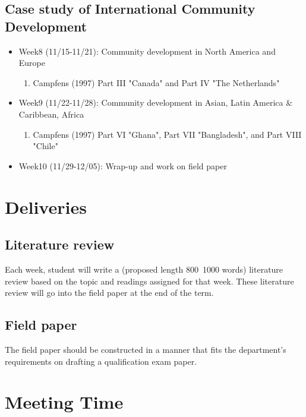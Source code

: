 \documentclass{article}
\begin{document}
\subsection{Case study of International Community Development}

\begin{itemize}
    \item Week8 (11/15-11/21): Community development in North America and Europe
        \begin{enumerate}
            \item[ ] Campfens (1997) Part III "Canada" and Part IV "The Netherlands"
        \end{enumerate}
        
    \item Week9 (11/22-11/28): Community development in Asian, Latin America & Caribbean, Africa
        \begin{enumerate}
            \item[ ] Campfens (1997) Part VI "Ghana", Part VII "Bangladesh", and Part VIII "Chile"
        \end{enumerate}
    \item Week10 (11/29-12/05): Wrap-up and work on field paper
\end{itemize}


\section{Deliveries}

\subsection{Literature review} 
Each week, student will write a (proposed length 800~1000 words) literature review based on the topic and readings assigned for that week. These literature review will go into the field paper at the end of the term.

\subsection{Field paper}
The field paper should be constructed in a manner that fits the department's requirements on drafting a qualification exam paper. 
    
\section{Meeting Time}
\end{document}
